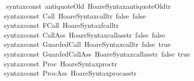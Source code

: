 \begin{isabellebody}
{\isacartoucheclose}\isanewline
\isanewline
\isanewline
{}\isamarkupfalse%
\ {\isacartoucheopen}\isanewline
\ {\isacharbrackleft}{\isacharparenleft}{\isacharat}{\isacharbraceleft}syntax{\isacharunderscore}const\ {\isachardoublequote}{\isacharunderscore}antiquoteOld{\isachardoublequote}{\isacharbraceright}{\isacharcomma}\ Hoare{\isacharunderscore}Syntax{\isachardot}antiquoteOld{\isacharunderscore}tr{\isacharparenright}{\isacharcomma}\isanewline
\ \ {\isacharparenleft}{\isacharat}{\isacharbraceleft}syntax{\isacharunderscore}const\ {\isachardoublequote}{\isacharunderscore}Call{\isachardoublequote}{\isacharbraceright}{\isacharcomma}\ Hoare{\isacharunderscore}Syntax{\isachardot}call{\isacharunderscore}tr\ false\ false{\isacharparenright}{\isacharcomma}\isanewline
\ \ {\isacharparenleft}{\isacharat}{\isacharbraceleft}syntax{\isacharunderscore}const\ {\isachardoublequote}{\isacharunderscore}FCall{\isachardoublequote}{\isacharbraceright}{\isacharcomma}\ Hoare{\isacharunderscore}Syntax{\isachardot}fcall{\isacharunderscore}tr{\isacharparenright}{\isacharcomma}\isanewline
\ \ {\isacharparenleft}{\isacharat}{\isacharbraceleft}syntax{\isacharunderscore}const\ {\isachardoublequote}{\isacharunderscore}CallAss{\isachardoublequote}{\isacharbraceright}{\isacharcomma}\ Hoare{\isacharunderscore}Syntax{\isachardot}call{\isacharunderscore}ass{\isacharunderscore}tr\ false\ false{\isacharparenright}{\isacharcomma}\isanewline
\ \ {\isacharparenleft}{\isacharat}{\isacharbraceleft}syntax{\isacharunderscore}const\ {\isachardoublequote}{\isacharunderscore}GuardedCall{\isachardoublequote}{\isacharbraceright}{\isacharcomma}\ Hoare{\isacharunderscore}Syntax{\isachardot}call{\isacharunderscore}tr\ false\ true{\isacharparenright}{\isacharcomma}\isanewline
\ \ {\isacharparenleft}{\isacharat}{\isacharbraceleft}syntax{\isacharunderscore}const\ {\isachardoublequote}{\isacharunderscore}GuardedCallAss{\isachardoublequote}{\isacharbraceright}{\isacharcomma}\ Hoare{\isacharunderscore}Syntax{\isachardot}call{\isacharunderscore}ass{\isacharunderscore}tr\ false\ true{\isacharparenright}{\isacharcomma}\isanewline
\ \ {\isacharparenleft}{\isacharat}{\isacharbraceleft}syntax{\isacharunderscore}const\ {\isachardoublequote}{\isacharunderscore}Proc{\isachardoublequote}{\isacharbraceright}{\isacharcomma}\ Hoare{\isacharunderscore}Syntax{\isachardot}proc{\isacharunderscore}tr{\isacharparenright}{\isacharcomma}\isanewline
\ \ {\isacharparenleft}{\isacharat}{\isacharbraceleft}syntax{\isacharunderscore}const\ {\isachardoublequote}{\isacharunderscore}ProcAss{\isachardoublequote}{\isacharbraceright}{\isacharcomma}\ Hoare{\isacharunderscore}Syntax{\isachardot}proc{\isacharunderscore}ass{\isacharunderscore}tr{\isacharparenright}{\isacharcomma}\isanewline

\end{isabellebody}
